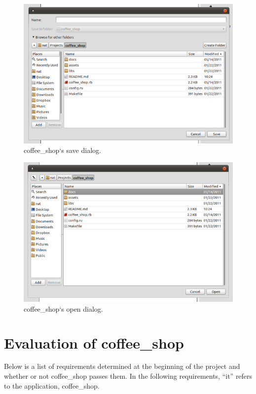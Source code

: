 \documentclass[10pt]{article}
\begin{document}
\begin{figure}
   \centering
      \includegraphics[width=130mm]{images/coffee_shop6.png}
   \caption{coffee\_shop`s save dialog.}
\end{figure}

\begin{figure}
   \centering
      \includegraphics[width=130mm]{images/coffee_shop7.png}
   \caption{coffee\_shop`s open dialog.}
\end{figure}

\section{Evaluation of coffee\_shop}

Below is a list of requirements determined at the beginning of the project and whether or not coffee\_shop passes them. In the following requirements, ``it'' refers to the application, coffee\_shop.
\end{document}
